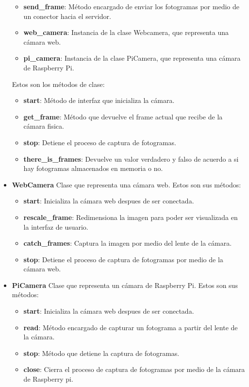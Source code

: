 \begin{itemize}
        \begin{itemize}
            \item \textbf{send\_frame}: Método encargado de enviar los fotogramas por medio de un conector hacia el servidor.
            \item \textbf{web\_camera}: Instancia de la clase Webcamera, que representa una cámara web.
            \item \textbf{pi\_camera}: Instancia de la clase PiCamera, que representa una cámara de Raspberry Pi.
        \end{itemize}
        Estos son los métodos de clase:
        \begin{itemize}
            \item \textbf{start}: Método de interfaz que inicializa la cámara.
            \item \textbf{get\_frame}: Método que devuelve el frame actual que recibe de la cámara fisica.
            \item \textbf{stop}: Detiene el proceso de captura de fotogramas.
            \item \textbf{there\_is\_frames}: Devuelve un valor verdadero y falso de acuerdo a si hay fotogramas almacenados en memoria o no.
        \end{itemize}
    \item \textbf{WebCamera} Clase que representa una cámara web. Estos son sus métodos:
        \begin{itemize}
            \item \textbf{start}: Inicializa la cámara web despues de ser conectada.
            \item \textbf{rescale\_frame}: Redimensiona la imagen para poder ser visualizada en la interfaz de usuario.
            \item \textbf{catch\_frames}: Captura la imagen por medio del lente de la cámara.
            \item \textbf{stop}: Detiene el proceso de captura de fotogramas por medio de la cámara web.
        \end{itemize}
    \item \textbf{PiCamera} Clase que representa un cámara de Raspberry Pi. Estos son sus métodos:
        \begin{itemize}
            \item \textbf{start}: Inicializa la cámara web despues de ser conectada.
            \item \textbf{read}: Método encargado de capturar un fotograma a partir del lente de la cámara.
            \item \textbf{stop}: Método que detiene la captura de fotogramas.
            \item \textbf{close}: Cierra el proceso de captura de fotogramas por medio de la cámara de Raspberry pi.
        \end{itemize}
\end{itemize}

